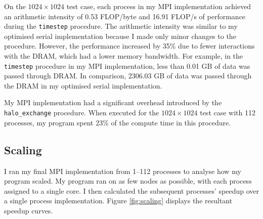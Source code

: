 \documentclass[twocolumn, a4paper]{article}
\begin{document}
On the $1024 \times 1024$ test case, each process in my MPI implementation achieved an arithmetic intensity of 0.53 FLOP/byte and 16.91 FLOP/s of performance during the \texttt{timestep} procedure.
The arithmetic intensity was similar to my optimised serial implementation because I made only minor changes to the procedure.
However, the performance increased by 35\% due to fewer interactions with the DRAM, which had a lower memory bandwidth.
For example, in the \texttt{timestep} procedure in my MPI implementation, less than 0.01 GB of data was passed through DRAM.
In comparison, 2306.03 GB of data was passed through the DRAM in my optimised serial implementation.

My MPI implementation had a significant overhead introduced by the \texttt{halo\_exchange} procedure.
When executed for the $1024\times1024$ test case with 112 processes, my program spent 23\% of the compute time in this procedure.

\subsection{Scaling}

I ran my final MPI implementation from 1--112 processes to analyse how my program scaled.
My program ran on as few nodes as possible, with each process assigned to a single core. 
I then calculated the subsequent processes' speedup over a single process implementation.
Figure \ref{fig:scaling} displays the resultant speedup curves.
\end{document}
